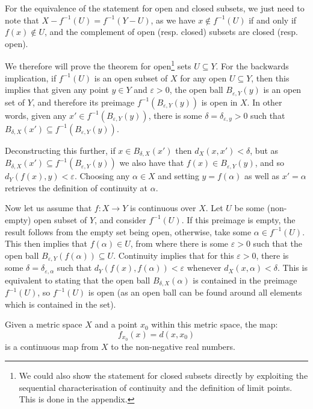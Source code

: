 \begin{bproof}{}{}
For the equivalence of the statement for open and closed subsets, we just need to note that \mbox{$X - f^{-1}(U) = f^{-1}(Y - U)$}, as we have \mbox{$x\not\in f^{-1}(U)$} if and only if $f(x) \not\in U$, and the complement of open (resp. closed) subsets are closed (resp. open).

We therefore will prove the theorem for open\footnote{We could also show the statement for closed subsets directly by exploiting the sequential characterisation of continuity and the definition of limit points. This is done in the appendix.} sets $U\subseteq Y$. For the backwards implication, if $f^{-1}(U)$ is an open subset of $X$ for any open $U\subseteq Y$, then this implies that given any point $y\in Y$ and $\varepsilon>0$, the open ball $B_{\varepsilon, Y}(y)$ is an open set of $Y$, and therefore its preimage $f^{-1}(B_{\varepsilon, Y}(y))$ is open in $X$. In other words, given any \mbox{$x'\in f^{-1}(B_{\varepsilon, Y}(y))$,} there is some \mbox{$\delta = \delta_{\varepsilon, y}>0$} such that \mbox{$B_{\delta, X}(x') \subseteq f^{-1}(B_{\varepsilon, Y}(y))$.} 

Deconstructing this further, if $x\in B_{\delta, X}(x')$ then $d_{X}(x,x')<\delta$, but as \mbox{$B_{\delta, X}(x') \subseteq f^{-1}(B_{\varepsilon, Y}(y))$} we also have that \mbox{$f(x) \in B_{\varepsilon, Y}(y)$}, and so \mbox{$d_{Y}(f(x), y) < \varepsilon$.} Choosing any $\alpha\in X$ and setting $y = f(\alpha)$ as well as $x' = \alpha$ retrieves the definition of continuity at $\alpha$.

Now let us assume that $f : X \to Y$ is continuous over $X$. Let $U$ be some (non-empty) open subset of $Y$, and consider $f^{-1}(U)$. If this preimage is empty, the result follows from the empty set being open, otherwise, take some $\alpha\in f^{-1}(U)$. This then implies that $f(\alpha)\in U$, from where there is some $\varepsilon>0$ such that the open ball $B_{\varepsilon, Y}(f(\alpha)) \subseteq U$. Continuity implies that for this $\varepsilon>0$, there is some $\delta = \delta_{\varepsilon, \alpha}$ such that $d_{Y}(f(x),f(\alpha))< \varepsilon$ whenever $d_{X}(x,\alpha)< \delta$. This is equivalent to stating that the open ball $B_{\delta, X}(\alpha)$ is contained in the preimage $f^{-1}(U)$, so $f^{-1}(U)$ is open (as an open ball can be found around all elements which is contained in the set).
\eop
\end{bproof}


\begin{bprop}{}{}
Given a metric space $X$ and a point $x_{0}$ within this metric space, the map: \[ f_{x_{0}}(x) = d(x,x_{0}) \] is a continuous map from $X$ to the non-negative real numbers.
\end{bprop}


